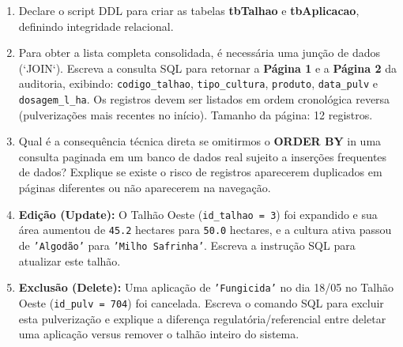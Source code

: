 \documentclass[12pt,a4paper]{article}
\newcommand{\resposta}[1]{}
\begin{document}
\begin{center}
{%
    }
\end{center}

\vspace{0.4cm}

\begin{enumerate}[label=\textbf{\alph*)}]
    \item Declare o script DDL para criar as tabelas \textbf{tbTalhao} e \textbf{tbAplicacao}, definindo integridade relacional.
    \resposta{5cm}
    
    \item Para obter a lista completa consolidada, é necessária uma junção de dados (`JOIN`). Escreva a consulta SQL para retornar a \textbf{Página 1} e a \textbf{Página 2} da auditoria, exibindo: \texttt{codigo\_talhao}, \texttt{tipo\_cultura}, \texttt{produto}, \texttt{data\_pulv} e \texttt{dosagem\_l\_ha}. Os registros devem ser listados em ordem cronológica reversa (pulverizações mais recentes no início). Tamanho da página: 12 registros.
    \resposta{4cm}

    \item Qual é a consequência técnica direta se omitirmos o \textbf{ORDER BY} in uma consulta paginada em um banco de dados real sujeito a inserções frequentes de dados? Explique se existe o risco de registros aparecerem duplicados em páginas diferentes ou não aparecerem na navegação.
    \resposta{2.5cm}

    \item \textbf{Edição (Update):} O Talhão Oeste (\texttt{id\_talhao = 3}) foi expandido e sua área aumentou de \texttt{45.2} hectares para \texttt{50.0} hectares, e a cultura ativa passou de \texttt{'Algodão'} para \texttt{'Milho Safrinha'}. Escreva a instrução SQL para atualizar este talhão.
    \resposta{2.5cm}

    \item \textbf{Exclusão (Delete):} Uma aplicação de \texttt{'Fungicida'} no dia 18/05 no Talhão Oeste (\texttt{id\_pulv = 704}) foi cancelada. Escreva o comando SQL para excluir esta pulverização e explique a diferença regulatória/referencial entre deletar uma aplicação versus remover o talhão inteiro do sistema.
    \resposta{3.5cm}
    

    
\end{enumerate}
\end{document}
